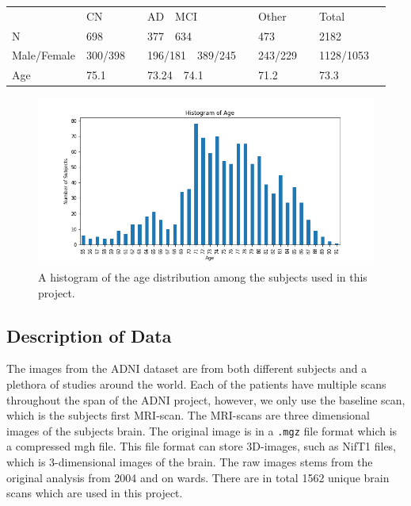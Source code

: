\documentclass[12pt, fleqn, titlepage]{article}
\begin{document}
\begin{table}[H]
	\begin{tabular}{llllll}
		& CN&\ \ AD\ \ MCI &\ \ Other &\ \ Total   \\
		N & 698&\ \ 377\ \ 634 &\ \ 473 &\ \ 2182   \\
		Male/Female & 300/398&\ \ 196/181\ \ 389/245 &\ \ 243/229  &\ \ 1128/1053   \\
		Age & 75.1&\ \ 73.24\ \ 74.1 &\ \ 71.2 &\ \ 73.3   \\
	\end{tabular}
\end{table}


\begin{figure}[H]
	\centering
	\includegraphics[width=0.9\linewidth]{imgs/age_distro}
	\caption{A histogram of the age distribution among the subjects used in this project.} 
	\label{fig:age}
\end{figure}


\subsection{Description of Data} \label{dataDescription}


The images from the ADNI dataset are from both different subjects and a plethora of studies around the world. 
Each of the patients have multiple scans throughout the span of the ADNI project, however, we only use the baseline scan, which is the subjects first MRI-scan. 
The MRI-scans are three dimensional images of the subjects brain. 
The original image is in a \texttt{.mgz} file format which is a compressed mgh file. 
This file format can store 3D-images, such as NifT1 files, which is 3-dimensional images of the brain. 
The raw images stems from the original analysis from 2004 and on wards. 
There are in total 1562 %
unique brain scans which are used in this project.
\end{document}
